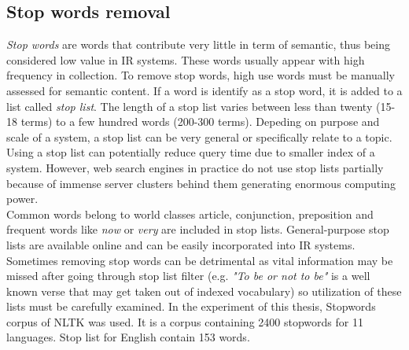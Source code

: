 \subsection*{Stop words removal}
\textit{Stop words} are words that contribute very little in term of semantic, thus being considered low value in IR systems. These words usually appear with high frequency in collection. To remove stop words, high use words must be manually assessed for semantic content. If a word is identify as a stop word, it is added to a list called \textit{stop list}. The length of a stop list varies between less than twenty (15-18 terms) to a few hundred words (200-300 terms). Depeding on purpose and scale of a system, a stop list can be very general or specifically relate to a topic.\\
Using a stop list can potentially reduce query time due to smaller index of a system. However, web search engines in practice do not use stop lists partially because of immense server clusters behind them generating enormous computing power. \\
Common words belong to world classes article, conjunction, preposition and frequent words like \textit{now} or \textit{very} are included in stop lists. General-purpose stop lists are available online and can be easily incorporated into IR systems. Sometimes removing stop words can be detrimental as vital information may be missed after going through stop list filter (e.g. \textit{"To be or not to be"} is a well known verse that may get taken out of indexed vocabulary) so utilization of these lists must be carefully examined. In the experiment of this thesis, Stopwords corpus of NLTK was used. It is a corpus containing 2400 stopwords for 11 languages. Stop list for English contain 153 words.

